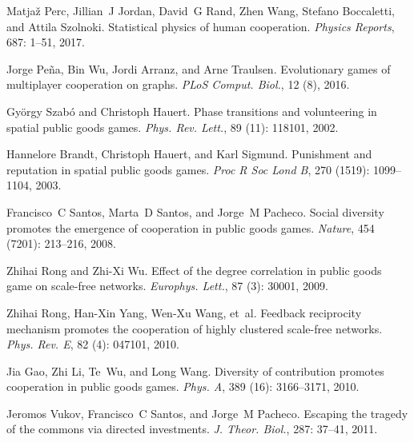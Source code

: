 Matja{\v{z}} Perc, Jillian~J Jordan, David~G Rand, Zhen Wang, Stefano
Boccaletti, and Attila Szolnoki.
\newblock Statistical physics of human cooperation.
\newblock \emph{Physics Reports}, 687: 1--51, 2017.

Jorge Pe{\~n}a, Bin Wu, Jordi Arranz, and Arne Traulsen.
\newblock Evolutionary games of multiplayer cooperation on graphs.
\newblock \emph{PLoS Comput. Biol.}, 12 (8), 2016.

Gy{\"o}rgy Szab{\'o} and Christoph Hauert.
\newblock Phase transitions and volunteering in spatial public goods games.
\newblock \emph{Phys. Rev. Lett.}, 89 (11): 118101, 2002.

Hannelore Brandt, Christoph Hauert, and Karl Sigmund.
\newblock Punishment and reputation in spatial public goods games.
\newblock \emph{Proc R Soc Lond B}, 270 (1519): 1099--1104,
2003.

Francisco~C Santos, Marta~D Santos, and Jorge~M Pacheco.
\newblock Social diversity promotes the emergence of cooperation in public
goods games.
\newblock \emph{Nature}, 454 (7201): 213--216, 2008.

Zhihai Rong and Zhi-Xi Wu.
\newblock Effect of the degree correlation in public goods game on scale-free
networks.
\newblock \emph{Europhys. Lett.}, 87 (3): 30001, 2009.

Zhihai Rong, Han-Xin Yang, Wen-Xu Wang, et~al.
\newblock Feedback reciprocity mechanism promotes the cooperation of highly
clustered scale-free networks.
\newblock \emph{Phys. Rev. E}, 82 (4): 047101, 2010.

Jia Gao, Zhi Li, Te~Wu, and Long Wang.
\newblock Diversity of contribution promotes cooperation in public goods games.
\newblock \emph{Phys. A}, 389 (16): 3166--3171, 2010.

Jeromos Vukov, Francisco~C Santos, and Jorge~M Pacheco.
\newblock Escaping the tragedy of the commons via directed investments.
\newblock \emph{J. Theor. Biol.}, 287: 37--41, 2011.

